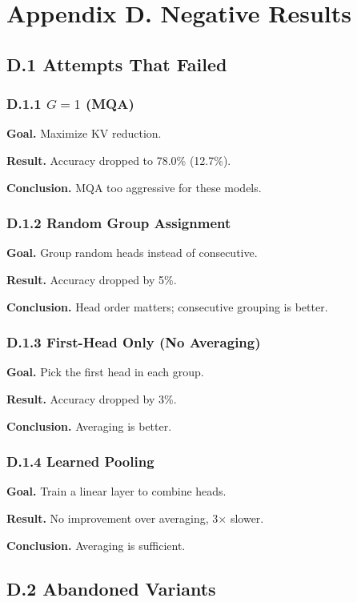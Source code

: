 
\section{Appendix D. Negative Results}

\subsection{D.1 Attempts That Failed}

\subsubsection{D.1.1 $G = 1$ (MQA)}

\textbf{Goal.} Maximize KV reduction.

\textbf{Result.} Accuracy dropped to 78.0\% (12.7\%).

\textbf{Conclusion.} MQA too aggressive for these models.

\subsubsection{D.1.2 Random Group Assignment}

\textbf{Goal.} Group random heads instead of consecutive.

\textbf{Result.} Accuracy dropped by 5\%.

\textbf{Conclusion.} Head order matters; consecutive grouping is better.

\subsubsection{D.1.3 First-Head Only (No Averaging)}

\textbf{Goal.} Pick the first head in each group.

\textbf{Result.} Accuracy dropped by 3\%.

\textbf{Conclusion.} Averaging is better.

\subsubsection{D.1.4 Learned Pooling}

\textbf{Goal.} Train a linear layer to combine heads.

\textbf{Result.} No improvement over averaging, 3$\times$ slower.

\textbf{Conclusion.} Averaging is sufficient.

\subsection{D.2 Abandoned Variants}


